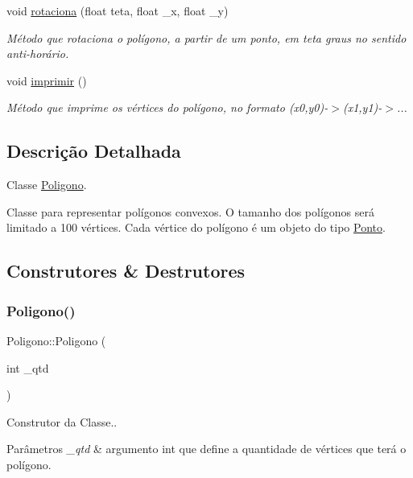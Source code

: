 \begin{DoxyCompactItemize}
void \hyperlink{classPoligono_a93da79ac2b0cfd723c4c041f2fe1190c}{rotaciona} (float teta, float \+\_\+x, float \+\_\+y)
\begin{DoxyCompactList}\small\item\em Método que rotaciona o polígono, a partir de um ponto, em teta graus no sentido anti-\/horário. \end{DoxyCompactList}\item 
\mbox{\label{classPoligono_a754dee9ed6a8fee4eb1a9d0aa0e1707a}} 
void \hyperlink{classPoligono_a754dee9ed6a8fee4eb1a9d0aa0e1707a}{imprimir} ()
\begin{DoxyCompactList}\small\item\em Método que imprime os vértices do polígono, no formato (x0,y0)-\/$>$(x1,y1)-\/$>$... \end{DoxyCompactList}\end{DoxyCompactItemize}


\subsection{Descrição Detalhada}
Classe \hyperlink{classPoligono}{Poligono}. 

Classe para representar polígonos convexos. O tamanho dos polígonos será limitado a 100 vértices. Cada vértice do polígono é um objeto do tipo \hyperlink{classPonto}{Ponto}. 

\subsection{Construtores \& Destrutores}
\mbox{\label{classPoligono_a9944b44a710f3fa23e90b5e2112923f9}} 
\subsubsection{\texorpdfstring{Poligono()}{Poligono()}}
{\footnotesize\ttfamily Poligono\+::\+Poligono (\begin{DoxyParamCaption}\item[{int}]{\+\_\+qtd }\end{DoxyParamCaption})}



Construtor da Classe.. 


\begin{DoxyParams}{Parâmetros}
{\em \+\_\+qtd} & argumento int que define a quantidade de vértices que terá o polígono. \\
\hline
\end{DoxyParams}


